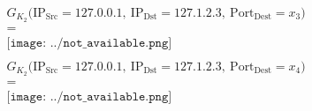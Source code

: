 \documentclass{standalone}
\begin{document}
\begin{minipage}{9.6cm}
\[
		\begin{aligned}
			 & \begin{array}{c}
				   G_{K_2}\bigl(\text{IP}_{\text{Src}} = 127.0.0.1,\ \text{IP}_{\text{Dst}} = 127.1.2.3,\ \text{Port}_{\text{Dest}} = x_3 \bigr) \\[0.3em]
				   =                                                                                                                             \\[0.3em]
           \texttt{[image: ../not\_available.png]}
			   \end{array}
			\\[0.5cm]
			 & \begin{array}{c}
				   G_{K_2}\bigl(\text{IP}_{\text{Src}} = 127.0.0.1,\ \text{IP}_{\text{Dst}} = 127.1.2.3,\ \text{Port}_{\text{Dest}} = x_4 \bigr) \\[0.3em]
				   =                                                                                                                             \\[0.3em]
           \texttt{[image: ../not\_available.png]}
			   \end{array}
		\end{aligned}
\]
\end{minipage}
\end{document}
